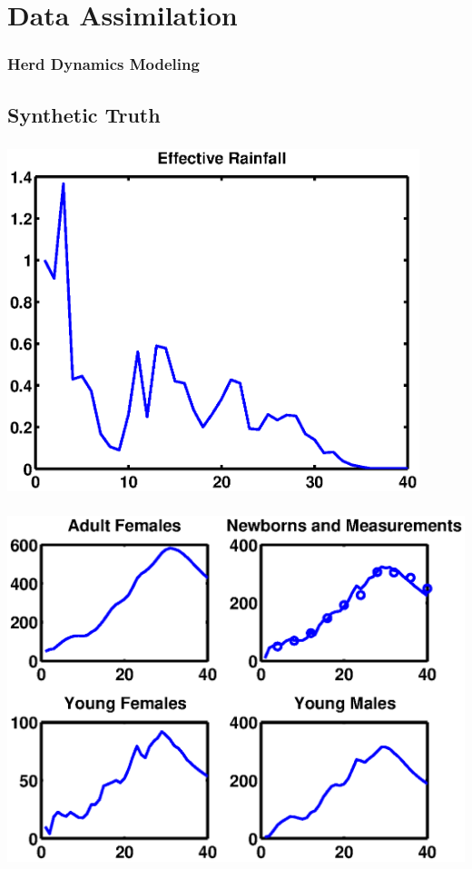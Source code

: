 \documentclass[mathserif]{beamer}
\begin{document}
\section{Data Assimilation}

\begin{frame}
  \frametitle{Herd Dynamics Modeling}
  \tableofcontents[currentsection]
\end{frame}

\subsection{Synthetic Truth}
\begin{frame}
  \begin{center}
    \frametitle{\insertsubsection}
    \includegraphics[width=0.9\textwidth]{forcing}
  \end{center}
\end{frame}

\begin{frame}
  \begin{center}
    \frametitle{\insertsubsection}
    \includegraphics[width=1\textwidth]{truth}
  \end{center}
\end{frame}
\end{document}
